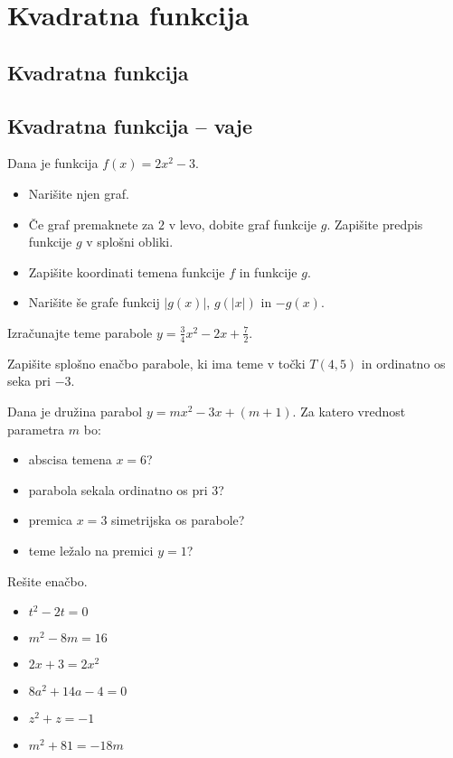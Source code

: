 \chapter{Kvadratna funkcija}

\section{Kvadratna funkcija}

\newpage
\section*{Kvadratna funkcija -- vaje}
\normalsize
\begin{naloga}
    Dana je funkcija $f(x)=2x^2-3$.
    \begin{itemize}
        \item Narišite njen graf.
        \item Če graf premaknete za $2$ v levo, dobite graf funkcije $g$. Zapišite predpis funkcije $g$ v splošni obliki.
        \item Zapišite koordinati temena funkcije $f$ in funkcije $g$.
        \item Narišite še grafe funkcij $|g(x)|$, $g(|x|)$ in $-g(x)$.
    \end{itemize}
\end{naloga}

\begin{naloga}
    Izračunajte teme parabole $y=\frac{3}{4}x^2-2x+\frac{7}{2}$.
\end{naloga}

\begin{naloga}
    Zapišite splošno enačbo parabole, ki ima teme v točki $T(4,5)$ in ordinatno os seka pri $-3$.
\end{naloga}

\begin{naloga}
    Dana je družina parabol $y=mx^2-3x+(m+1)$. Za katero vrednost parametra $m$ bo:
    \begin{itemize}
        \item abscisa temena $x=6$?
        \item parabola sekala ordinatno os pri $3$?
        \item premica $x=3$ simetrijska os parabole?
        \item teme ležalo na premici $y=1$?
    \end{itemize}
\end{naloga}

\begin{naloga}
    Rešite enačbo.
    \begin{itemize}
        \item $t^2-2t=0$
        \item $m^2-8m=16$
        \item $2x+3=2x^2$
        \item $8a^2+14a-4=0$
        \item $z^2+z=-1$
        \item $m^2+81=-18m$
    \end{itemize}
\end{naloga}

